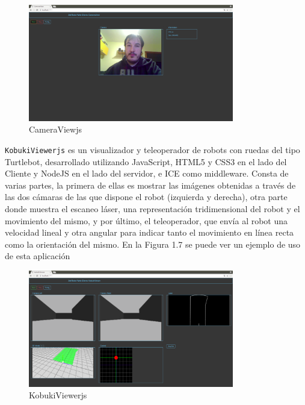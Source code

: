 \begin{figure}[H]
  \begin{center}
    \includegraphics[width=0.8\textwidth]{figures/cameraviewjs.png}
		\caption{CameraViewjs}
		\label{fig.cameraviewjs}
		\end{center}
\end{figure}


\texttt{KobukiViewerjs} es un visualizador y teleoperador de robots con ruedas del tipo Turtlebot, desarrollado utilizando JavaScript, HTML5 y CSS3 en el lado del Cliente y NodeJS en el lado del servidor, e ICE como middleware. Consta de varias partes, la primera de ellas es mostrar las imágenes obtenidas a través de las dos cámaras de las que dispone el robot (izquierda y derecha), otra parte donde muestra el escaneo láser, una representación tridimensional del robot y el movimiento del mismo, y por último, el teleoperador, que envía al robot una velocidad lineal y otra angular para indicar tanto el movimiento en línea recta como la orientación del mismo. En la Figura 1.7 se puede ver un ejemplo de uso de esta aplicación

\begin{figure}[H]
  \begin{center}
    \includegraphics[width=0.8\textwidth]{figures/kobukiviewerjs.png}
		\caption{KobukiViewerjs}
		\label{fig.kobukiviewerjs}
		\end{center}
\end{figure}

